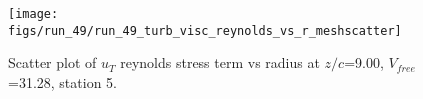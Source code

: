 \begin{figure}[H]
\centering
\texttt{[image: figs/run\_49/run\_49\_turb\_visc\_reynolds\_vs\_r\_meshscatter]}
\caption{Scatter plot of $
u_T$ reynolds stress term vs radius at $z/c$=9.00, $V_{free}$=31.28, station 5.}
\label{fig:run_49_turb_visc_reynolds_vs_r_meshscatter}
\end{figure}



